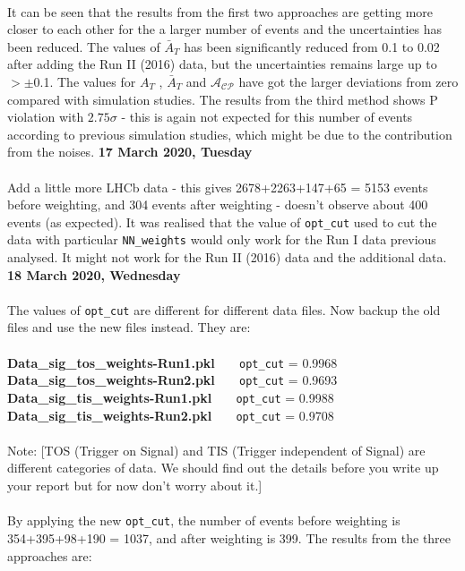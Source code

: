 \\
It can be seen that the results from the first two approaches are getting more closer to each other for the a larger number of events and the uncertainties has been reduced. The values of $\bar{A}_T$ has been significantly reduced from 0.1 to 0.02 after adding the Run II (2016) data, but the uncertainties remains large up to $>\pm$0.1. The values for $A_T$ , $\bar{A}_T$ and $\mathcal{A}_{\mathcal{C}\mathcal{P}}$ have got the larger deviations from zero compared with simulation studies. The results from the third method shows P violation with $2.75\sigma$ - this is again not expected for this number of events according to previous simulation studies, which might be due to the contribution from the noises.
\clearpage
\noindent\textbf{17 March 2020, Tuesday}
\\
\\
Add a little more LHCb data - this gives 2678+2263+147+65 = 5153 events before weighting, and 304 events after weighting - doesn't observe about 400 events (as expected). It was realised that the value of \texttt{opt\_cut} used to cut the data with particular \texttt{NN\_weights} would only work for the Run I data previous analysed. It might not work for the Run II (2016) data and the additional data.
\clearpage
\noindent\textbf{18 March 2020, Wednesday}
\\
\\
The values of \texttt{opt\_cut} are different for different data files. Now backup the old files and use the new files instead. They are:
\\
\\
\textbf{Data\_sig\_tos\_weights-Run1.pkl}$\;\;\;\;\;\;\;$\texttt{opt\_cut} = 0.9968
\\
\textbf{Data\_sig\_tos\_weights-Run2.pkl}$\;\;\;\;\;\;\;$\texttt{opt\_cut} = 0.9693
\\
\textbf{Data\_sig\_tis\_weights-Run1.pkl}$\;\;\;\;\;\;\;$\texttt{opt\_cut} = 0.9988
\\
\textbf{Data\_sig\_tis\_weights-Run2.pkl}$\;\;\;\;\;\;\;$\texttt{opt\_cut} = 0.9708
\\
\\
Note: [TOS (Trigger on Signal) and TIS (Trigger independent of Signal) are different categories of data. We should find out the details before you write up your report but for now don’t worry about it.]
\\
\\
By applying the new \texttt{opt\_cut}, the number of events before weighting is 354+395+98+190 = 1037, and after weighting is 399. The results from the three approaches are:
